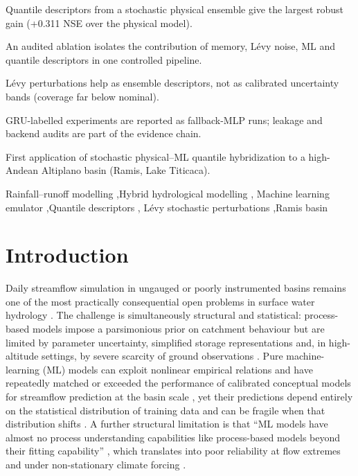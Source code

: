 \documentclass[a4paper,fleqn]{cas-sc}
\begin{document}
\begin{highlights}
\item Quantile descriptors from a stochastic physical ensemble give the
largest robust gain (+0.311 NSE over the physical model).
\item An audited ablation isolates the contribution of memory, L\'{e}vy
noise, ML and quantile descriptors in one controlled pipeline.
\item L\'{e}vy perturbations help as ensemble descriptors, not as
calibrated uncertainty bands (coverage far below nominal).
\item GRU-labelled experiments are reported as fallback-MLP runs;
leakage and backend audits are part of the evidence chain.
\item First application of stochastic physical--ML quantile
hybridization to a high-Andean Altiplano basin (Ramis, Lake Titicaca).
\end{highlights}

\begin{keywords}
Rainfall--runoff modelling \sep Hybrid hydrological modelling \sep
Machine learning emulator \sep Quantile descriptors \sep
L\'{e}vy stochastic perturbations \sep Ramis basin
\end{keywords}

\maketitle

\section{Introduction}\label{sec:introduction}

Daily streamflow simulation in ungauged or poorly instrumented basins
remains one of the most practically consequential open problems in
surface water hydrology \citep{razavi2013}. The challenge is
simultaneously structural and statistical: process-based models impose
a parsimonious prior on catchment behaviour but are limited by
parameter uncertainty, simplified storage representations and, in
high-altitude settings, by severe scarcity of ground observations
\citep{adnan2021comparison,nauditt2017}. Pure machine-learning (ML)
models can exploit nonlinear empirical relations and have repeatedly
matched or exceeded the performance of calibrated conceptual models for
streamflow prediction at the basin scale
\citep{arsenault2022,kratzert2019towards,lees2021}, yet their
predictions depend entirely on the statistical distribution of training
data and can be fragile when that distribution shifts
\citep{frame2021,zhong2023}. A further structural limitation is that
``ML models have almost no process understanding capabilities like
process-based models beyond their fitting capability''
\citep{li2024process}, which translates into poor reliability at flow
extremes and under non-stationary climate forcing \citep{zhong2023}.
\end{document}
